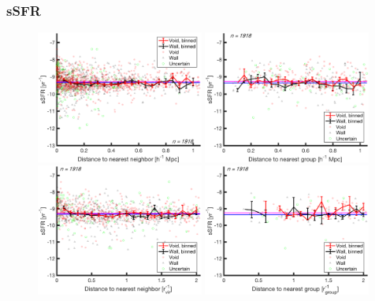 \subsubsection{sSFR}

\begin{figure}
    \includegraphics[width=0.49\textwidth]{Images/smallScaleEnvironment/1sig_dwarf_I06relations_absDist_sSFR}
    \includegraphics[width=0.49\textwidth]{Images/smallScaleEnvironment/1sig_dwarf_I06relations_groupAbsDist_sSFR}
    \includegraphics[width=0.49\textwidth]{Images/smallScaleEnvironment/1sig_dwarf_I06relations_virDist_sSFR}
    \includegraphics[width=0.49\textwidth]{Images/smallScaleEnvironment/1sig_dwarf_I06relations_groupRDist_sSFR}

\end{figure}
